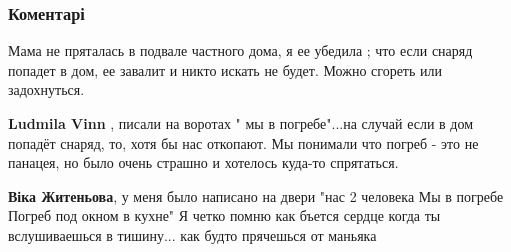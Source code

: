  
 
 
 
 
\subsubsection{Коментарі}

\begin{itemize}
 

Мама не пряталась в подвале частного дома, я ее убедила ; что если снаряд
попадет в дом, ее завалит и никто искать не будет. Можно сгореть или
задохнуться.

\begin{itemize}
 
\textbf{Ludmila Vinn} , писали на воротах " мы в погребе"...на случай если в дом попадёт снаряд, то, хотя бы нас откопают. Мы понимали что погреб - это не панацея, но было очень страшно и хотелось куда-то спрятаться.

 
\textbf{Віка Житеньова}, у меня было написано на двери "нас 2 человека
Мы в погребе
Погреб под окном в кухне"
Я четко помню как бъется сердце когда ты вслушиваешься в тишину... как будто прячешься от маньяка

 

\end{itemize}
\end{itemize}
